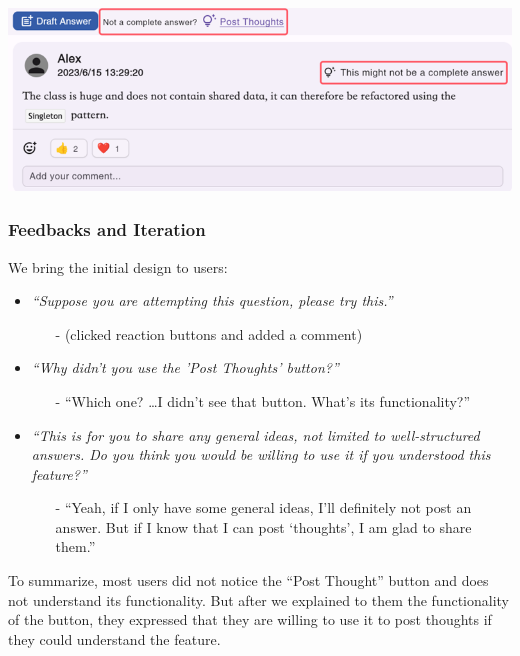\documentclass[a4paper]{article}
\begin{document}
    \noindent \includegraphics[width=\textwidth]{thought1}

    \subsubsection*{Feedbacks and Iteration}
    \noindent We bring the initial design to users:

    \begin{itemize}
        \item \textit{``Suppose you are attempting this question, please try this.''}
        \begin{itemize}
            \item[-] (clicked reaction buttons and added a comment)
        \end{itemize}

        \item \textit{``Why didn't you use the 'Post Thoughts' button?''}
        \begin{itemize}
            \item[-] ``Which one? \ldots I didn't see that button.
            What's its functionality?''
        \end{itemize}

        \item
        \textit{``This is for you to share any general ideas, not limited to well-structured answers.
        Do you think you would be willing to use it if you understood this feature?''}
        \begin{itemize}
            \item[-] ``Yeah, if I only have some general ideas, I'll definitely not post an answer.
            But if I know that I can post `thoughts', I am glad to share them.''
        \end{itemize}
    \end{itemize}

    To summarize, most users did not notice the ``Post Thought'' button and does not understand its functionality.
    But after we explained to them the functionality of the button, they expressed that they are willing to use it to post thoughts
    if they could understand the feature.
\end{document}
